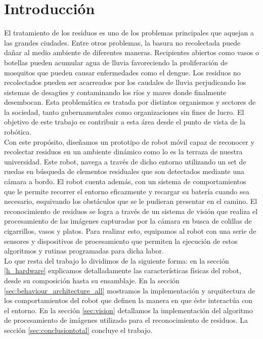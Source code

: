 
\section{\label{intro} Introducci\'on}
El tratamiento de los residuos es uno de los problemas principales que 
aquejan a las grandes ciudades. Entre otros problemas, la basura no 
recolectada puede da\~nar al medio ambiente de diferentes maneras. Recipientes
abiertos como vasos o botellas pueden acumular agua de lluvia favoreciendo la 
proliferaci\'on de mosquitos que pueden causar enfermedades como el dengue. Los
residuos no recolectados pueden ser acarreados por los caudales de lluvia
perjudicando los sistemas de desag\"ues y contaminando los r\'ios y mares donde
finalmente desembocan. Esta problem\'atica es tratada por distintos organismos
y sectores de la sociedad, tanto gubernamentales como organizaciones sin fines
de lucro. El objetivo de este trabajo es contribuir a esta \'area desde el
punto de vista de la rob\'otica.
\\\indent
Con este prop\'osito, dise\~namos un prototipo de robot m\'ovil capaz de
reconocer y recolectar residuos en un ambiente din\'amico como lo es la terraza
de nuestra universidad. Este robot, navega a trav\'es de dicho entorno
utilizando un set de ruedas en b\'usqueda de elementos residuales que
son detectados mediante una c\'amara a bordo. El robot cuenta adem\'as,
con un sistema de comportamientos que le permite recorrer el entorno
eficazmente y recargar su bater\'ia cuando sea necesario, esquivando
los obst\'aculos que se le pudieran presentar en el camino. El reconocimiento
de residuos se logra a trav\'es de un sistema de visi\'on que realiza el
procesamiento de las im\'agenes capturadas por la c\'amara en busca de colillas
de cigarrillos, vasos y platos. Para realizar esto, equipamos al robot con
una serie de sensores y dispositivos de procesamiento que permiten la
ejecuci\'on de estos algoritmos y rutinas programadas para dicha labor.
\\\indent
Lo que resta del trabajo lo dividimos de la siguiente forma: en la secci\'on
\ref{h_hardware} explicamos detalladamente las caracter\'isticas f\'isicas del
robot, desde su composici\'on hasta su ensamblaje. En la secci\'on
\ref{sec:behaviour_architecture_all} mostramos la implementaci\'on y
arquitectura de los comportamientos del robot que definen la manera en que
\'este interact\'ua con el entorno. En la secci\'on \ref{sec:vision}
detallamos la implementaci\'on del algoritmo de procesamiento de im\'agenes
utilizado para el reconocimiento de residuos. La secci\'on
\ref{sec:conclusiontotal} concluye el trabajo.

